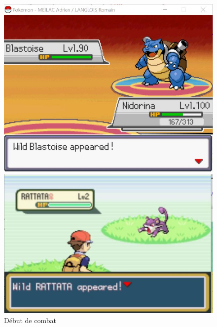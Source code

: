 \documentclass[a4paper,twoside, openany,11pt]{book}
\begin{document}
\begin{figure}[!h]
\begin{minipage}{0.49\textwidth}
\includegraphics[scale = 0.6]{Graphiques/combat_start.jpg}
\end{minipage}
\begin{minipage}{0.49\textwidth}
\includegraphics[scale = 0.84]{Graphiques/vrai_jeu_combat_start.jpg}
\end{minipage}
\caption{Début de combat}
\end{figure}
\end{document}
